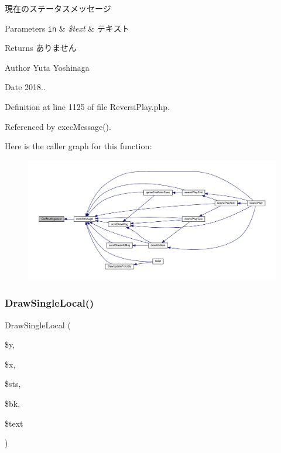 現在のステータスメッセージ 


\begin{DoxyParams}[1]{Parameters}
\mbox{\tt in}  & {\em \$text} & テキスト \\
\hline
\end{DoxyParams}
\begin{DoxyReturn}{Returns}
ありません 
\end{DoxyReturn}
\begin{DoxyAuthor}{Author}
Yuta Yoshinaga 
\end{DoxyAuthor}
\begin{DoxyDate}{Date}
2018.. 
\end{DoxyDate}


Definition at line 1125 of file Reversi\+Play.\+php.



Referenced by exec\+Message().

Here is the caller graph for this function\+:
\nopagebreak
\begin{figure}[H]
\begin{center}
\leavevmode
\includegraphics[width=350pt]{class_reversi_play_ae3da8fb1a3a365c6e5254e5cf6f1e7bc_icgraph}
\end{center}
\end{figure}
\mbox{\label{class_reversi_play_af0649b9d4a899e0802c739928136de99}} 
\subsubsection{\texorpdfstring{Draw\+Single\+Local()}{DrawSingleLocal()}}
{\footnotesize\ttfamily Draw\+Single\+Local (\begin{DoxyParamCaption}\item[{}]{\$y,  }\item[{}]{\$x,  }\item[{}]{\$sts,  }\item[{}]{\$bk,  }\item[{}]{\$text }\end{DoxyParamCaption})\hspace{0.3cm}{\ttfamily [private]}}



